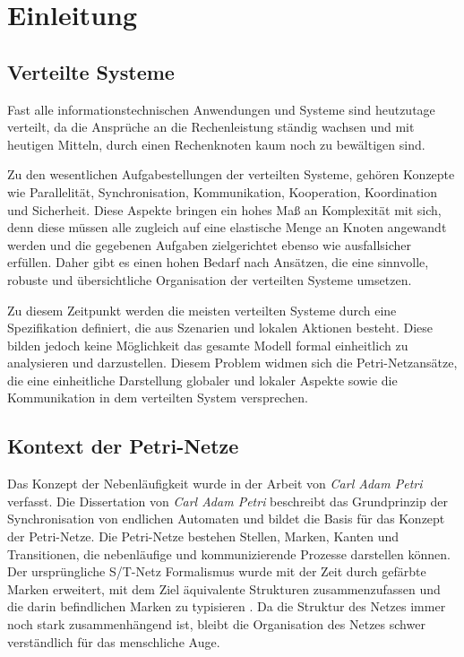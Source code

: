 \chapter{Einleitung}

\section{Verteilte Systeme}

	Fast alle informationstechnischen Anwendungen und Systeme sind heutzutage verteilt, da die Ansprüche an die Rechenleistung ständig wachsen und mit heutigen Mitteln, durch einen Rechenknoten kaum noch zu bewältigen sind. \bigbreak

	Zu den wesentlichen Aufgabestellungen der verteilten Systeme, gehören Konzepte wie Parallelität, Synchronisation, Kommunikation, Kooperation, Koordination und Sicherheit. Diese Aspekte bringen ein hohes Maß an Komplexität mit sich, denn diese müssen alle zugleich auf eine elastische Menge an Knoten angewandt werden und die gegebenen Aufgaben zielgerichtet ebenso wie ausfallsicher erfüllen. Daher gibt es einen hohen Bedarf nach Ansätzen, die eine sinnvolle, robuste und übersichtliche Organisation der verteilten Systeme umsetzen. \bigbreak

	Zu diesem Zeitpunkt werden die meisten verteilten Systeme durch eine Spezifikation definiert, die aus Szenarien und lokalen Aktionen besteht. Diese bilden jedoch keine Möglichkeit das gesamte Modell formal einheitlich zu analysieren und darzustellen. Diesem Problem widmen sich die Petri-Netzansätze, die eine einheitliche Darstellung globaler und lokaler Aspekte sowie die Kommunikation in dem verteilten System versprechen. \cite{ochsenschlager2013modellierung}

\section{Kontext der Petri-Netze} \label{sec:KdP} 

	Das Konzept der Nebenläufigkeit wurde in der Arbeit von \textit{Carl Adam Petri} verfasst. Die Dissertation von \textit{Carl Adam Petri} \cite{Petr} beschreibt das Grundprinzip der Synchronisation von endlichen Automaten und bildet die Basis für das Konzept der Petri-Netze. Die Petri-Netze bestehen Stellen, Marken, Kanten und Transitionen, die nebenläufige und kommunizierende Prozesse darstellen können. Der ursprüngliche S/T-Netz \cite{Jess} Formalismus wurde mit der Zeit durch gefärbte Marken erweitert, mit dem Ziel äquivalente Strukturen zusammenzufassen und die darin befindlichen Marken zu typisieren \cite{Kummer02}. Da die Struktur des Netzes immer noch stark zusammenhängend ist, bleibt die Organisation des Netzes schwer verständlich für das menschliche Auge.\bigbreak

